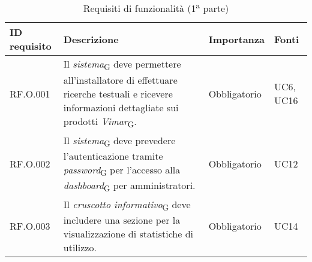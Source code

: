 \begin{table}[H]
\centering
    \begin{tabular}{|C{2.7cm}|L{7.2cm}|C{2.7cm}|C{2cm}|}
        \hline
        \textbf{ID requisito} & \textbf{Descrizione} & \textbf{Importanza} & \textbf{Fonti}  \\
        \hline
        RF.O.001 & Il \textit{sistema}\textsubscript{G} deve permettere all'installatore di effettuare ricerche testuali e ricevere informazioni dettagliate sui prodotti \textit{Vimar}\textsubscript{G}. & Obbligatorio & UC6, UC16 \\
        \hline
        RF.O.002 & Il \textit{sistema}\textsubscript{G} deve prevedere l'autenticazione tramite \textit{password}\textsubscript{G} per l'accesso alla \textit{dashboard}\textsubscript{G} per amministratori. & Obbligatorio & UC12 \\
        \hline
        RF.O.003 & Il \textit{cruscotto informativo}\textsubscript{G} deve includere una sezione per la visualizzazione di statistiche di utilizzo. & Obbligatorio & UC14 \\
        \hline
    \end{tabular}
    \caption{Requisiti di funzionalità (1\textsuperscript{a}  parte)}
\end{table}
